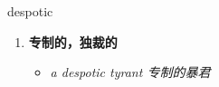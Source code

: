 
\begin{frame}
{\huge despotic}
\begin{center}
\begin{enumerate}\Large
  \item \textbf{专制的，独裁的}
  \begin{itemize}
    \item \em{\Large{a despotic tyrant 专制的暴君}}
  \end{itemize}
\end{enumerate}
\end{center}
\end{frame}
